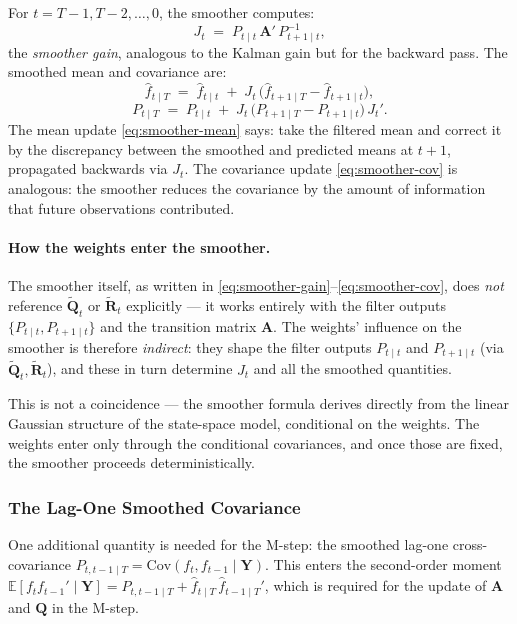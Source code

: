 \documentclass[11pt, a4paper, oneside]{article}
\newcommand{\mY}{\mathbf{Y}}
\newcommand{\mA}{\mathbf{A}}
\newcommand{\mR}{\mathbf{R}}
\newcommand{\mQ}{\mathbf{Q}}
\begin{document}
For $t = T-1, T-2, \ldots, 0$, the smoother computes:
\begin{equation}
J_t \;=\; P_{t \mid t}\, \mA'\, P_{t+1 \mid t}^{-1},
\label{eq:smoother-gain}
\end{equation}
the \emph{smoother gain}, analogous to the Kalman gain but for the
backward pass. The smoothed mean and covariance are:
\begin{equation}
\boxed{\;\;
\hat{f}_{t \mid T} \;=\; \hat{f}_{t \mid t} \;+\; J_t\,\big(\hat{f}_{t+1 \mid T} - \hat{f}_{t+1 \mid t}\big),
\;\;}
\label{eq:smoother-mean}
\end{equation}
\begin{equation}
\boxed{\;\;
P_{t \mid T} \;=\; P_{t \mid t} \;+\; J_t\,\big(P_{t+1 \mid T} - P_{t+1 \mid t}\big)\,J_t'.
\;\;}
\label{eq:smoother-cov}
\end{equation}
The mean update \eqref{eq:smoother-mean} says: take the filtered mean
and correct it by the discrepancy between the smoothed and predicted
means at $t+1$, propagated backwards via $J_t$. The covariance update
\eqref{eq:smoother-cov} is analogous: the smoother reduces the
covariance by the amount of information that future observations
contributed.

\paragraph{How the weights enter the smoother.}
The smoother itself, as written in \eqref{eq:smoother-gain}–\eqref{eq:smoother-cov},
does \emph{not} reference $\tilde{\mQ}_t$ or $\tilde{\mR}_t$ explicitly —
it works entirely with the filter outputs $\{P_{t \mid t}, P_{t+1 \mid t}\}$
and the transition matrix $\mA$. The weights' influence on the smoother
is therefore \emph{indirect}: they shape the filter outputs
$P_{t \mid t}$ and $P_{t+1 \mid t}$ (via
$\tilde{\mQ}_t, \tilde{\mR}_t$), and these in turn determine $J_t$ and
all the smoothed quantities.

This is not a coincidence — the smoother formula derives directly from
the linear Gaussian structure of the state-space model, conditional on
the weights. The weights enter only through the conditional
covariances, and once those are fixed, the smoother proceeds
deterministically.

\subsubsection{The Lag-One Smoothed Covariance}

One additional quantity is needed for the M-step: the smoothed lag-one
cross-covariance $P_{t, t-1 \mid T} = \mathrm{Cov}(f_t, f_{t-1} \mid \mY)$.
This enters the second-order moment
$\mathbb{E}[f_t f_{t-1}' \mid \mY] = P_{t, t-1 \mid T} + \hat{f}_{t \mid T}\, \hat{f}_{t-1 \mid T}'$,
which is required for the update of $\mA$ and $\mQ$ in the M-step.
\end{document}

